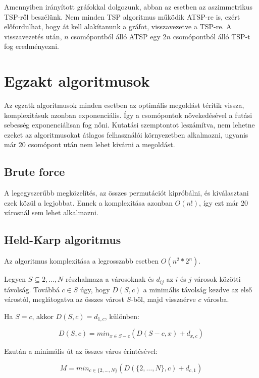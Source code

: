 Amennyiben irányított gráfokkal dolgozunk, abban az esetben az aszimmetrikus TSP-ről beszélünk. Nem minden TSP algoritmus működik ATSP-re is, ezért előfordulhat, hogy át kell alakítanunk a gráfot, visszavezetve a TSP-re. A visszavezetés után, \(n\) csomópontból álló ATSP egy \(2n\) csomópontból álló TSP-t fog eredményezni\cite{atsp}.

\section{Egzakt algoritmusok}\label{sec:ALAP:adatelem}

Az egzatk algoritmusok minden esetben az optimális megoldást térítik vissza, komplexitásuk azonban exponenciális. Így a csomópontok növekedésével a futási sebesség exponenciálisan fog nőni. Kutatási szemptontot leszámítva, nem lehetne ezeket az algoritmusokat átlagos felhasználói környezetben alkalmazni, ugyanis már 20 csomópont után nem lehet kivárni a megoldást. 

\subsection{Brute force}

A legegyszerűbb megközelítés, az összes permutációt kipróbálni, és kiválasztani ezek közül a legjobbat. Ennek a komplexitása azonban \(O(n!)\), így ezt már 20 városnál sem lehet alkalmazni.


\subsection{Held-Karp algoritmus}

Az algoritmus komplexitása a legrosszabb esetben \(O(n^2*2^n)\).

Legyen \(S \subseteq {2, \dots, N}\) részhalmaza a városoknak és \(d_{ij}\) az \(i\) és \(j\) városok közötti távolság. Továbbá \(c \in S\) úgy, hogy \(D(S,c)\) a minimális távolság kezdve az első várostól, meglátogatva az összes várost \(S\)-ből, majd visszaérve \(c\) városba\cite{held}.

Ha \(S = {c}\), akkor \(D(S,c) = d_{1,c}\), különben:

\begin{equation}
D(S,c) = min_{x \in S-c}(D(S - c,x)+d_{x,c})
\end{equation}

Ezután a minimális út az összes város érintésével:

\begin{equation}
M = min_{c \in \{2, \dots, N\}}(D(\{2, \dots, N\}, c)+d_{c, 1})
\end{equation}

